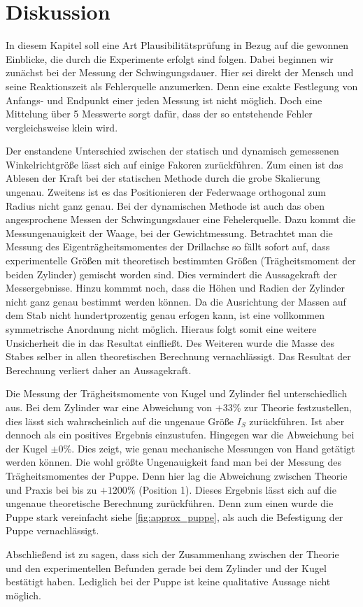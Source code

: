 \section{Diskussion}
In diesem Kapitel soll eine Art Plausibilitätsprüfung in Bezug auf die
gewonnen Einblicke, die durch die Experimente erfolgt sind folgen.
Dabei beginnen wir zunächst bei der Messung der Schwingungsdauer.
Hier sei direkt der Mensch und seine Reaktionszeit als Fehlerquelle anzumerken.
Denn eine exakte Festlegung von Anfangs- und Endpunkt einer jeden Messung ist
nicht möglich. %
Doch eine Mittelung
über 5 Messwerte sorgt dafür, dass der so entstehende Fehler vergleichsweise klein wird.

Der enstandene Unterschied zwischen der statisch und dynamisch gemessenen Winkelrichtgröße
lässt sich auf einige Fakoren zurückführen.
Zum einen ist das Ablesen der Kraft bei der statischen Methode
durch die grobe Skalierung ungenau.
Zweitens ist es das Positionieren der Federwaage orthogonal zum Radius
nicht ganz genau.
Bei der dynamischen Methode ist auch das oben angesprochene Messen der Schwingungsdauer
eine Fehelerquelle.
Dazu kommt die Messungenauigkeit der Waage, bei der Gewichtmessung.
Betrachtet man die Messung des Eigenträgheitsmomentes der Drillachse so fällt sofort auf,
dass experimentelle Größen mit theoretisch bestimmten Größen (Trägheitsmoment der beiden Zylinder)
gemischt worden sind.
Dies vermindert die Aussagekraft der Messergebnisse.
Hinzu kommmt noch, dass die  Höhen und Radien der Zylinder nicht ganz genau bestimmt werden können.
Da die Ausrichtung der Massen auf dem Stab nicht hundertprozentig genau erfogen kann, ist
eine vollkommen symmetrische Anordnung nicht möglich.
Hieraus folgt somit eine weitere Unsicherheit die in das Resultat einfließt.
Des Weiteren wurde die Masse des Stabes selber in allen theoretischen Berechnung vernachlässigt.
Das Resultat der Berechnung verliert daher an Aussagekraft.

Die Messung der Trägheitsmomente von Kugel und Zylinder fiel unterschiedlich aus.
Bei dem Zylinder war eine Abweichung von $+33\%$ zur Theorie festzustellen,
dies lässt sich wahrscheinlich auf die ungenaue Größe $I_S$ zurückführen.
Ist aber dennoch als ein positives Ergebnis einzustufen.
Hingegen war die Abweichung bei der Kugel $\pm 0\%$. Dies zeigt,
wie genau mechanische Messungen von Hand getätigt werden können.
Die wohl größte Ungenauigkeit fand man bei der Messung des Trägheitsmomentes der Puppe.
Denn hier lag die Abweichung zwischen Theorie und Praxis bei bis zu
$+1200\%$ (Position 1). Dieses Ergebnis lässt sich auf die
ungenaue theoretische Berechnung zurückführen.
Denn zum einen wurde die Puppe stark vereinfacht siehe \ref{fig:approx_puppe}, als auch
die Befestigung der Puppe vernachlässigt.  %

Abschließend ist zu sagen, dass sich der Zusammenhang zwischen der Theorie und den experimentellen Befunden
gerade bei dem Zylinder und der Kugel bestätigt haben.
Lediglich bei der Puppe ist keine qualitative Aussage nicht möglich.
